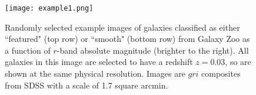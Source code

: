 \documentclass[usenatbib]{mn2e}
\begin{document}
\begin{figure}
\texttt{[image: example1.png]}
\caption{Randomly selected example images of galaxies classified as either ``featured" (top row) or ``smooth" (bottom row) from Galaxy Zoo as a function of $r$-band absolute magnitude (brighter to the right).  All galaxies in this image are selected to have a redshift $z=0.03$, so are shown at the same physical resolution. Images are $gri$ composites from SDSS with a scale of 1.7 square arcmin.  \label{examples}}
\end{figure}


\end{document}
